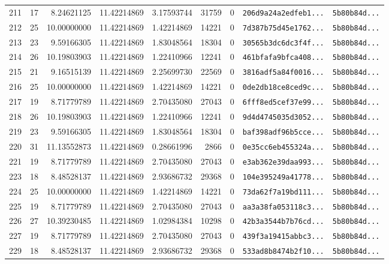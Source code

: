\documentclass[10pt]{article}
\begin{document}
\begin{longtable}{rrrrrrrll}
  211 & 17 & 8.24621125 & 11.42214869 & 3.17593744 & 31759 & 0 & \texttt{206d9a24a2edfeb1...} & \texttt{5b80b84d...} \\
  212 & 25 & 10.00000000 & 11.42214869 & 1.42214869 & 14221 & 0 & \texttt{7d387b75d45e1762...} & \texttt{5b80b84d...} \\
  213 & 23 & 9.59166305 & 11.42214869 & 1.83048564 & 18304 & 0 & \texttt{30565b3dc6dc3f4f...} & \texttt{5b80b84d...} \\
  214 & 26 & 10.19803903 & 11.42214869 & 1.22410966 & 12241 & 0 & \texttt{461bfafa9bfca408...} & \texttt{5b80b84d...} \\
  215 & 21 & 9.16515139 & 11.42214869 & 2.25699730 & 22569 & 0 & \texttt{3816adf5a84f0016...} & \texttt{5b80b84d...} \\
  216 & 25 & 10.00000000 & 11.42214869 & 1.42214869 & 14221 & 0 & \texttt{0de2db18ce8ced9c...} & \texttt{5b80b84d...} \\
  217 & 19 & 8.71779789 & 11.42214869 & 2.70435080 & 27043 & 0 & \texttt{6fff8ed5cef37e99...} & \texttt{5b80b84d...} \\
  218 & 26 & 10.19803903 & 11.42214869 & 1.22410966 & 12241 & 0 & \texttt{9d4d4745035d3052...} & \texttt{5b80b84d...} \\
  219 & 23 & 9.59166305 & 11.42214869 & 1.83048564 & 18304 & 0 & \texttt{baf398adf96b5cce...} & \texttt{5b80b84d...} \\
  220 & 31 & 11.13552873 & 11.42214869 & 0.28661996 & 2866 & 0 & \texttt{0e35cc6eb455324a...} & \texttt{5b80b84d...} \\
  221 & 19 & 8.71779789 & 11.42214869 & 2.70435080 & 27043 & 0 & \texttt{e3ab362e39daa993...} & \texttt{5b80b84d...} \\
  223 & 18 & 8.48528137 & 11.42214869 & 2.93686732 & 29368 & 0 & \texttt{104e395249a41778...} & \texttt{5b80b84d...} \\
  224 & 25 & 10.00000000 & 11.42214869 & 1.42214869 & 14221 & 0 & \texttt{73da62f7a19bd111...} & \texttt{5b80b84d...} \\
  225 & 19 & 8.71779789 & 11.42214869 & 2.70435080 & 27043 & 0 & \texttt{aa3a38fa053118c3...} & \texttt{5b80b84d...} \\
  226 & 27 & 10.39230485 & 11.42214869 & 1.02984384 & 10298 & 0 & \texttt{42b3a3544b7b76cd...} & \texttt{5b80b84d...} \\
  227 & 19 & 8.71779789 & 11.42214869 & 2.70435080 & 27043 & 0 & \texttt{439f3a19415abbc3...} & \texttt{5b80b84d...} \\
  229 & 18 & 8.48528137 & 11.42214869 & 2.93686732 & 29368 & 0 & \texttt{533ad8b8474b2f10...} & \texttt{5b80b84d...} \\

\end{longtable}
\end{document}
